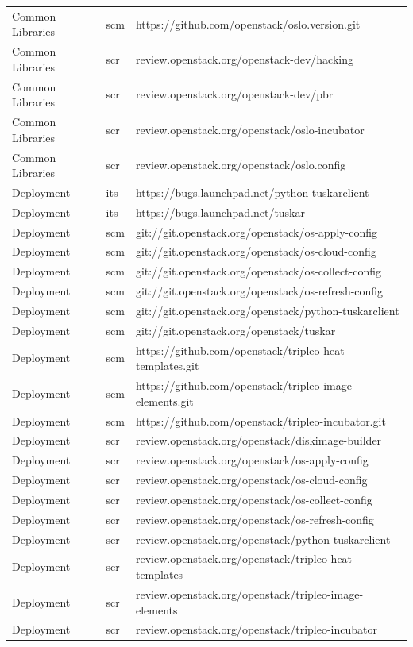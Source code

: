 \documentclass[a4wide,11pt]{report}
\begin{document}
\begin{center}
\begin{longtable}{|p{4cm}|p{1cm}|p{10cm}|}
Common Libraries&scm&https://github.com/openstack/oslo.version.git\\ 
Common Libraries&scr&review.openstack.org/openstack-dev/hacking\\ 
Common Libraries&scr&review.openstack.org/openstack-dev/pbr\\ 
Common Libraries&scr&review.openstack.org/openstack/oslo-incubator\\ 
Common Libraries&scr&review.openstack.org/openstack/oslo.config\\ 
Deployment&its&https://bugs.launchpad.net/python-tuskarclient\\ 
Deployment&its&https://bugs.launchpad.net/tuskar\\ 
Deployment&scm&git://git.openstack.org/openstack/os-apply-config\\ 
Deployment&scm&git://git.openstack.org/openstack/os-cloud-config\\ 
Deployment&scm&git://git.openstack.org/openstack/os-collect-config\\ 
Deployment&scm&git://git.openstack.org/openstack/os-refresh-config\\ 
Deployment&scm&git://git.openstack.org/openstack/python-tuskarclient\\ 
Deployment&scm&git://git.openstack.org/openstack/tuskar\\ 
Deployment&scm&https://github.com/openstack/tripleo-heat-templates.git\\ 
Deployment&scm&https://github.com/openstack/tripleo-image-elements.git\\ 
Deployment&scm&https://github.com/openstack/tripleo-incubator.git\\ 
Deployment&scr&review.openstack.org/openstack/diskimage-builder\\ 
Deployment&scr&review.openstack.org/openstack/os-apply-config\\ 
Deployment&scr&review.openstack.org/openstack/os-cloud-config\\ 
Deployment&scr&review.openstack.org/openstack/os-collect-config\\ 
Deployment&scr&review.openstack.org/openstack/os-refresh-config\\ 
Deployment&scr&review.openstack.org/openstack/python-tuskarclient\\ 
Deployment&scr&review.openstack.org/openstack/tripleo-heat-templates\\ 
Deployment&scr&review.openstack.org/openstack/tripleo-image-elements\\ 
Deployment&scr&review.openstack.org/openstack/tripleo-incubator\\ 

\end{longtable}
\end{center}
\end{document}

